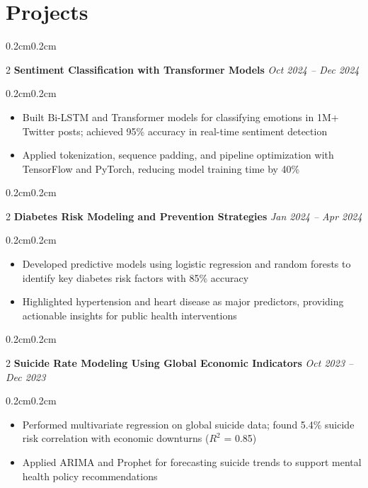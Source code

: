 \documentclass[10pt, letterpaper]{article}
\newenvironment{highlights}{\begin{itemize}[topsep=0.10 cm, parsep=0.10 cm, itemsep=0pt, leftmargin=0.6cm]}{\end{itemize}}
\newenvironment{onecolentry}{\begin{adjustwidth}{0.2cm}{0.2cm}}{\end{adjustwidth}}
\newenvironment{twocolentry}[2][]{\onecolentry\def\secondColumn{#2}\setcolumnwidth{\fill, 4.5 cm}\begin{paracol}{2}}{\switchcolumn \raggedleft \secondColumn\end{paracol}\endonecolentry}
\begin{document}
\section{Projects}
\begin{twocolentry}{\textit{Oct 2024 – Dec 2024}}
    \textbf{Sentiment Classification with Transformer Models}
\end{twocolentry}
\vspace{0.10 cm}
\begin{onecolentry}
\begin{highlights}
\item Built Bi-LSTM and Transformer models for classifying emotions in 1M+ Twitter posts; achieved 95\% accuracy in real-time sentiment detection
\item Applied tokenization, sequence padding, and pipeline optimization with TensorFlow and PyTorch, reducing model training time by 40\%
\end{highlights}
\end{onecolentry}

\vspace{0.2 cm}

\begin{twocolentry}{\textit{Jan 2024 – Apr 2024}}
    \textbf{Diabetes Risk Modeling and Prevention Strategies}
\end{twocolentry}
\vspace{0.10 cm}
\begin{onecolentry}
\begin{highlights}
\item Developed predictive models using logistic regression and random forests to identify key diabetes risk factors with 85\% accuracy
\item Highlighted hypertension and heart disease as major predictors, providing actionable insights for public health interventions
\end{highlights}
\end{onecolentry}

\vspace{0.2 cm}

\begin{twocolentry}{\textit{Oct 2023 – Dec 2023}}
    \textbf{Suicide Rate Modeling Using Global Economic Indicators}
\end{twocolentry}
\vspace{0.10 cm}
\begin{onecolentry}
\begin{highlights}
\item Performed multivariate regression on global suicide data; found 5.4\% suicide risk correlation with economic downturns ($R^2$ = 0.85)
\item Applied ARIMA and Prophet for forecasting suicide trends to support mental health policy recommendations
\end{highlights}
\end{onecolentry}
\end{document}
